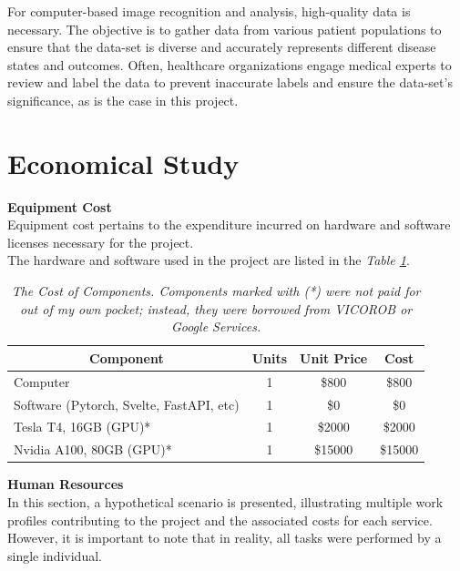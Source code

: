 For computer-based image recognition and analysis, high-quality data is necessary. The objective is to gather data from various patient populations to ensure that the data-set is diverse and accurately represents different disease states and outcomes. Often, healthcare organizations engage medical experts to review and label the data to prevent inaccurate labels and ensure the data-set's significance, as is the case in this project.

\section{Economical Study}

\vspace{0.5cm}
\textbf{Equipment Cost} \\

Equipment cost pertains to the expenditure incurred on hardware and software licenses necessary for the project. \\

The hardware and software used in the project are listed in the \textit{Table \ref{table:equipment_cost}}.

\begin{table}[H]
\centering
\begin{tabular}{| l | c | c | c |}
\hline
\multicolumn{1}{|c|}{Component} & \multicolumn{1}{c|}{Units} & \multicolumn{1}{c|}{Unit Price} & \multicolumn{1}{c|}{Cost} \\
\hline
Computer & 1 & \$800 & \$800 \\
\hline
Software (Pytorch, Svelte, FastAPI, etc) & 1 & \$0 & \$0 \\
\hline
Tesla T4, 16GB (GPU)* & 1 & \$2000 & \$2000 \\
\hline
Nvidia A100, 80GB (GPU)* & 1 & \$15000 & \$15000 \\
\hline
\end{tabular}
\caption[The Cost of Components.]{\textit{The Cost of Components. Components marked with (*) were not paid for out of my own pocket; instead, they were borrowed from VICOROB or Google Services.}}
{\label{table:equipment_cost}}
\end{table}

\vspace{0.5cm}
\textbf{Human Resources} \\

In this section, a hypothetical scenario is presented, illustrating multiple work profiles contributing to the project and the associated costs for each service. However, it is important to note that in reality, all tasks were performed by a single individual. \\


